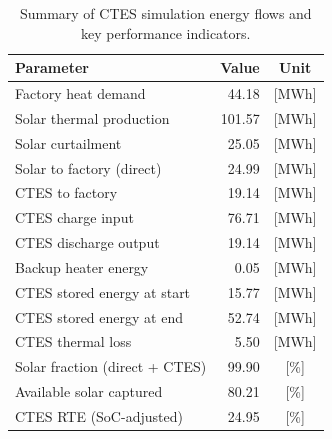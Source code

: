 \renewcommand{\arraystretch}{1.2}
\begin{table}[h]
\centering
\begin{tabular}{l|r c}
\hline
Parameter & Value & Unit \\
\hline
Factory heat demand & 44.18 & [MWh] \\
Solar thermal production & 101.57 & [MWh] \\
Solar curtailment & 25.05 & [MWh] \\
Solar to factory (direct) & 24.99 & [MWh] \\
CTES to factory & 19.14 & [MWh] \\
CTES charge input & 76.71 & [MWh] \\
CTES discharge output & 19.14 & [MWh] \\
Backup heater energy & 0.05 & [MWh] \\
CTES stored energy at start & 15.77 & [MWh] \\
CTES stored energy at end & 52.74 & [MWh] \\
CTES thermal loss & 5.50 & [MWh] \\
\hline
Solar fraction (direct + CTES) & 99.90 & [\%] \\
Available solar captured & 80.21 & [\%] \\
CTES RTE (SoC-adjusted) & 24.95 & [\%] \\
\hline
\end{tabular}
\caption{Summary of CTES simulation energy flows and key performance indicators.}
\label{tab:ctes-simulation-summary}
\end{table}
